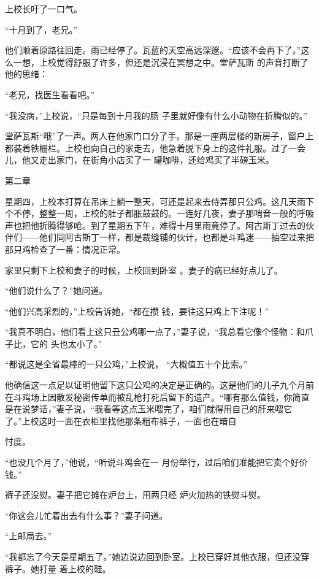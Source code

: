 \documentclass{article}
\begin{document}
上校长吁了一口气。 


“十月到了，老兄。” 

他们顺着原路往回走。雨已经停了。瓦蓝的天空高远深邃。“应该不会再下了。”这么一想，上校觉得舒服了许多，但还是沉浸在冥想之中。堂萨瓦斯
的声音打断了他的思绪： 


“老兄，找医生看看吧。” 

\newpage

“我没病，”上校说，“只是每到十月我的肠
子里就好像有什么小动物在折腾似的。” 

堂萨瓦斯“哦”了一声。两人在他家门口分了手。那是一座两层楼的新房子，窗户上都装着铁栅栏。上校也向自己的家走去，他急着脱下身上的这件礼服。过了一会儿，他又走出家门，在街角小店买了一
罐咖啡，还给鸡买了半磅玉米。 


 


第二章 

星期四，上校本打算在吊床上躺一整天，可还是起来去侍弄那只公鸡。这几天雨下个不停，整整一周，上校的肚子都胀鼓鼓的。一连好几夜，妻子那哨音一般的呼吸声也把他折腾得够呛。到了星期五下午，难得十月里雨竟停了。阿古斯丁过去的伙伴们——他们同阿古斯丁一样，都是裁缝铺的伙计，也都是斗鸡迷——抽空过来把那只鸡检查了一番：情况正常。

\newpage

家里只剩下上校和妻子的时候，上校回到卧室
。妻子的病已经好点儿了。 


“他们说什么了？”她问道。 

“他们兴高采烈的，”上校告诉她，“都在攒
钱，要往这只鸡上下注呢！” 

“我真不明白，他们看上这只丑公鸡哪一点了，”妻子说，“我总看它像个怪物：和爪子比，它的
头也太小了。” 

“都说这是全省最棒的一只公鸡，”上校说，
“大概值五十个比索。” 

他确信这一点足以证明他留下这只公鸡的决定是正确的。这是他们的儿子九个月前在斗鸡场上因散发秘密传单而被乱枪打死后留下的遗产。“哪有那么值钱，你简直是在说梦话，”妻子说，“我看等这点玉米喂完了，咱们就得用自己的肝来喂它了。”上校这时一面在衣柜里找他那条粗布裤子，一面也在暗自
\newpage

忖度。 

“也没几个月了，”他说，“听说斗鸡会在一
月份举行，过后咱们准能把它卖个好价钱。” 

裤子还没熨。妻子把它摊在炉台上，用两只经
炉火加热的铁熨斗熨。 

“你这会儿忙着出去有什么事？”妻子问道。


“上邮局去。” 

“我都忘了今天是星期五了。”她边说边回到卧室。上校已穿好其他衣服，但还没穿裤子。她打量
着上校的鞋。 
\end{document}
